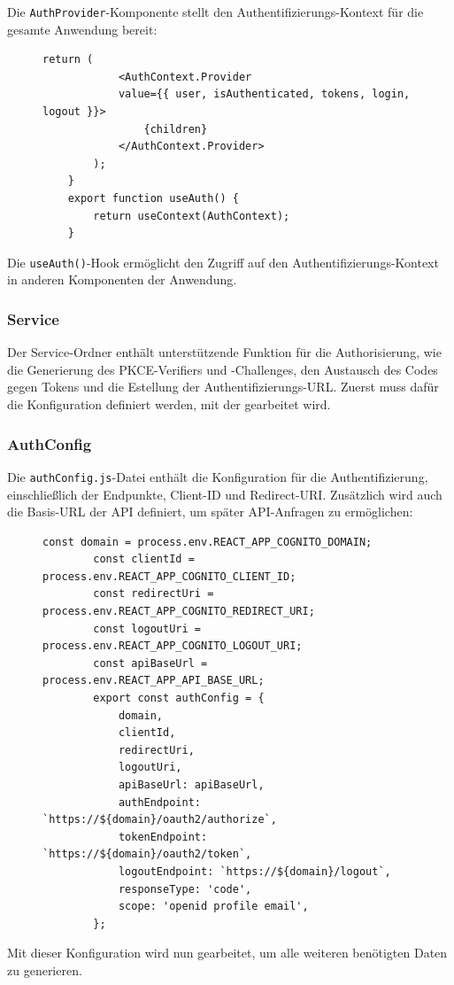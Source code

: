Die \texttt{AuthProvider}-Komponente stellt den Authentifizierungs-Kontext für die gesamte Anwendung bereit:
\begin{figure}[H]
    \begin{lstlisting}[caption=AuthProvider-Komponente, label=list:authcontextprovider]
        return (
            <AuthContext.Provider 
            value={{ user, isAuthenticated, tokens, login, logout }}>
                {children}
            </AuthContext.Provider>
        );
    }
    export function useAuth() {
        return useContext(AuthContext);
    }
    \end{lstlisting}
\end{figure}
Die \texttt{useAuth()}-Hook ermöglicht den Zugriff auf den Authentifizierungs-Kontext in anderen Komponenten der Anwendung.
\subsubsection{Service}    
Der Service-Ordner enthält unterstützende Funktion für die Authorisierung, wie die Generierung des PKCE-Verifiers 
und -Challenges, den Austausch des Codes gegen Tokens und die Estellung der Authentifizierungs-URL.
Zuerst muss dafür die Konfiguration definiert werden, mit der gearbeitet wird.
\subsubsection{AuthConfig}
Die \texttt{authConfig.js}-Datei enthält die Konfiguration für die Authentifizierung, einschließlich der Endpunkte, Client-ID und Redirect-URI. 
Zusätzlich wird auch die Basis-URL der API definiert, um später API-Anfragen zu ermöglichen:
\begin{figure}[H]
    \begin{lstlisting}[caption=AuthConfig, label=list:authconfig]
        const domain = process.env.REACT_APP_COGNITO_DOMAIN;
        const clientId = process.env.REACT_APP_COGNITO_CLIENT_ID; 
        const redirectUri = process.env.REACT_APP_COGNITO_REDIRECT_URI;
        const logoutUri = process.env.REACT_APP_COGNITO_LOGOUT_URI;
        const apiBaseUrl = process.env.REACT_APP_API_BASE_URL;
        export const authConfig = {
            domain,
            clientId,
            redirectUri,
            logoutUri,
            apiBaseUrl: apiBaseUrl,
            authEndpoint: `https://${domain}/oauth2/authorize`,
            tokenEndpoint: `https://${domain}/oauth2/token`,
            logoutEndpoint: `https://${domain}/logout`,
            responseType: 'code',
            scope: 'openid profile email',
        };
    \end{lstlisting}
\end{figure}
Mit dieser Konfiguration wird nun gearbeitet, um alle weiteren benötigten Daten zu generieren.

